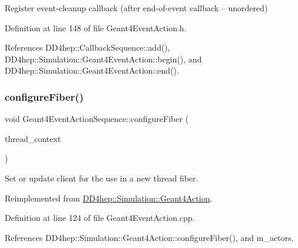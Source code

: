 Register event-\/cleanup callback (after end-\/of-\/event callback -- unordered) 



Definition at line 148 of file Geant4\+Event\+Action.\+h.



References D\+D4hep\+::\+Callback\+Sequence\+::add(), D\+D4hep\+::\+Simulation\+::\+Geant4\+Event\+Action\+::begin(), and D\+D4hep\+::\+Simulation\+::\+Geant4\+Event\+Action\+::end().

\hypertarget{class_d_d4hep_1_1_simulation_1_1_geant4_event_action_sequence_a552fac0ec8632b417f81453b4d79e0c4}{}\label{class_d_d4hep_1_1_simulation_1_1_geant4_event_action_sequence_a552fac0ec8632b417f81453b4d79e0c4} 
\subsubsection{\texorpdfstring{configure\+Fiber()}{configureFiber()}}
{\footnotesize\ttfamily void Geant4\+Event\+Action\+Sequence\+::configure\+Fiber (\begin{DoxyParamCaption}\item[{\hyperlink{class_d_d4hep_1_1_simulation_1_1_geant4_context}{Geant4\+Context} $\ast$}]{thread\+\_\+context }\end{DoxyParamCaption})\hspace{0.3cm}{\ttfamily [virtual]}}



Set or update client for the use in a new thread fiber. 



Reimplemented from \hyperlink{class_d_d4hep_1_1_simulation_1_1_geant4_action_a6adc7138508303e4e417cb48a737ab19}{D\+D4hep\+::\+Simulation\+::\+Geant4\+Action}.



Definition at line 124 of file Geant4\+Event\+Action.\+cpp.



References D\+D4hep\+::\+Simulation\+::\+Geant4\+Action\+::configure\+Fiber(), and m\+\_\+actors.

\hypertarget{class_d_d4hep_1_1_simulation_1_1_geant4_event_action_sequence_a5815e04637704ceddb2abd2677e1522b}{}\label{class_d_d4hep_1_1_simulation_1_1_geant4_event_action_sequence_a5815e04637704ceddb2abd2677e1522b} 
